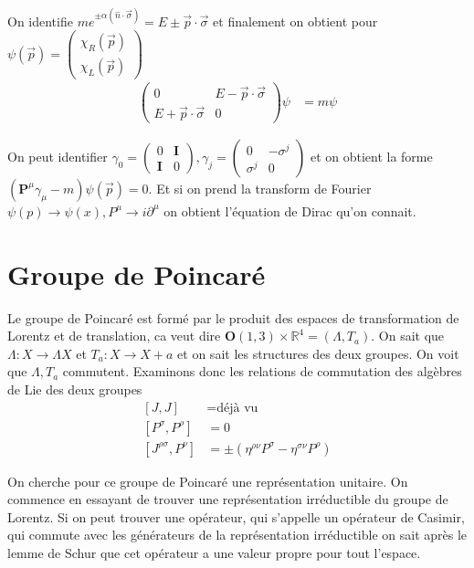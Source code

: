 \documentclass[10pt]{report}
\begin{document}
\begin{enumerate}[i)]
        On identifie $me^{\pm \alpha\left( \hat{n} \cdot \vec{\sigma} \right)} = E \pm \vec{p} \cdot \vec{\sigma}$ et finalement on obtient pour $\psi(\vec{p}) = \begin{pmatrix} \chi_R(\vec{p}) \\ \chi_L(\vec{p}) \end{pmatrix} $
        \begin{align}
            \begin{pmatrix} 0 & E-\vec{p}\cdot \vec{\sigma}\\E + \vec{p} \cdot \vec{\sigma} & 0 \end{pmatrix} \psi &= m\psi
        \end{align}

        On peut identifier $\gamma_0 = \begin{pmatrix} 0 & \mathbf{I} \\ \mathbf{I} & 0 \end{pmatrix} , \gamma_j = \begin{pmatrix} 0 & -\sigma^j\\ \sigma^j & 0 \end{pmatrix} $ et on obtient la forme $\left(\mathbf{P}^\mu\gamma_\mu - m\right)\psi(\vec{p}) = 0$. Et si on prend la transform de Fourier $\psi(p) \to \psi(x), P^\mu \to i\partial^\mu$ on obtient l'\'equation de Dirac qu'on connait.
\end{enumerate}

\section{Groupe de Poincar\'e}

Le groupe de Poincar\'e est form\'e par le produit des espaces de transformation de Lorentz et de translation, ca veut dire $\mathbf{O}(1,3) \times \mathbb{R}^4 = \left( \Lambda, T_a \right)$. On sait que $\Lambda: X \to \Lambda X$ et $T_a: X \to X + a$ et on sait les structures des deux groupes. On voit que $\Lambda, T_a$ commutent. Examinons donc les relations de commutation des alg\`ebres de Lie des deux groupes
\begin{align}
    \left[ J,J \right] &= \text{d\'ej\`a vu}\\\left[ P^\sigma, P^\rho \right] &= 0 \\ \left[ J^{\rho\sigma}, P^\nu \right] &= \pm \left( \eta^{\rho\nu}P^\sigma - \eta^{\sigma\nu}P^\rho\right)
\end{align}

On cherche pour ce groupe de Poincar\'e une repr\'esentation unitaire. On commence en essayant de trouver une repr\'esentation irr\'eductible du groupe de Lorentz. Si on peut trouver une op\'erateur, qui s'appelle un op\'erateur de Casimir, qui commute avec les g\'en\'erateurs de la repr\'esentation irr\'eductible on sait apr\`es le lemme de Schur que cet op\'erateur a une valeur propre pour tout l'espace.
\end{document}
